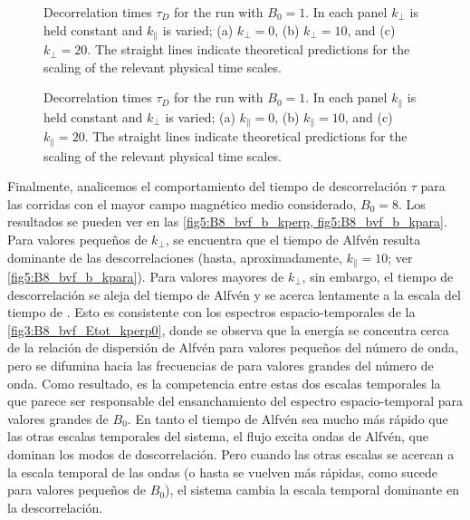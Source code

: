 \begin{figure}
  \centering


  \caption{Decorrelation times $\tau_D$ for the run with $B_0=1$. In each
    panel $k_\perp$ is held constant and $k_\parallel$ is varied; (a)
    $k_\perp=0$, (b) $k_\perp = 10$, and (c) $k_\perp = 20$. The
    straight lines indicate theoretical predictions for
    the scaling of the relevant physical time scales.}
  \label{fig5:B1_bvf_b_kperp}
\end{figure}

\begin{figure}
  \centering


  \caption{Decorrelation times $\tau_D$ for the run with $B_0=1$. In each
    panel $k_\parallel$ is held constant and $k_\perp$ is varied; (a)
    $k_\parallel = 0$, (b) $k_\parallel = 10$, and (c) $k_\parallel =
    20$. The straight lines indicate theoretical predictions for
    the scaling of the relevant physical time scales.}
  \label{fig5:B1_bvf_b_kpara}
\end{figure}

Finalmente, analicemos el comportamiento del tiempo de descorrelación
$\tau$ para las corridas con el mayor campo magnético medio
considerado, $B_0=8$. Los resultados se pueden ver en las
\cref{fig5:B8_bvf_b_kperp, fig5:B8_bvf_b_kpara}. Para valores pequeños
de $k_\perp$, se encuentra que el tiempo de Alfvén resulta dominante
de las descorrelaciones (hasta, aproximadamente, $k_\parallel = 10$;
ver \cref{fig5:B8_bvf_b_kpara}). Para valores mayores de $k_{\perp}$,
sin embargo, el tiempo de descorrelación se aleja del tiempo de Alfvén
y se acerca lentamente a la escala del tiempo de \sweeping. Esto es
consistente con los espectros espacio-temporales de la
\cref{fig3:B8_bvf_Etot_kperp0}, donde se observa que la energía se
concentra cerca de la relación de dispersión de Alfvén para valores
pequeños del número de onda, pero se difumina hacia las frecuencias de
\sweeping para valores grandes del número de onda.  Como resultado, es
la competencia entre estas dos escalas temporales la que parece ser
responsable del ensanchamiento del espectro espacio-temporal para
valores grandes de $B_0$. En tanto el tiempo de Alfvén sea mucho más
rápido que las otras escalas temporales del sistema, el flujo excita
ondas de Alfvén, que dominan los modos de doscorrelación. Pero cuando
las otras escalas se acercan a la escala temporal de las ondas (o
hasta se vuelven más rápidas, como sucede para valores pequeños de
$B_0$), el sistema cambia la escala temporal dominante en la
descorrelación.

